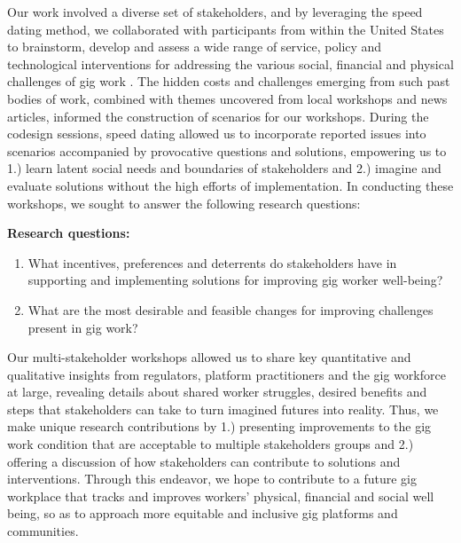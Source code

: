 Our work involved a diverse set of stakeholders, and by leveraging the speed dating method, we collaborated with participants from within the United States to brainstorm, develop and assess a wide range of service, policy and technological interventions for addressing the various social, financial and physical challenges of gig work \cite{Davidoff2007-fq}. The hidden costs and challenges emerging from such past bodies of work, combined with themes uncovered from local workshops and news articles, informed the construction of scenarios for our workshops. During the codesign sessions, speed dating allowed us to incorporate reported issues into scenarios accompanied by provocative questions and solutions, empowering us to 1.) learn latent social needs and boundaries of stakeholders and 2.) imagine and evaluate solutions without the high efforts of implementation. 
In conducting these workshops, we sought to answer the following research questions:

\textbf{Research questions: }
\begin{enumerate}
\item What incentives, preferences and deterrents do stakeholders have in supporting and implementing solutions for improving gig worker well-being?
\item What are the most desirable and feasible changes for improving challenges present in gig work?
\end{enumerate}

Our multi-stakeholder workshops allowed us to share key quantitative and qualitative insights from regulators, platform practitioners and the gig workforce at large, revealing details about shared worker struggles, desired benefits and steps that stakeholders can take to turn imagined futures into reality. Thus, we make unique research contributions by 1.) presenting improvements to the gig work condition that are acceptable to multiple stakeholders groups and 2.) offering a discussion of how stakeholders can contribute to solutions and interventions. Through this endeavor, we hope to contribute to a future gig workplace that tracks and improves workers' physical, financial and social well being, so as to approach more equitable and inclusive gig platforms and communities. 

